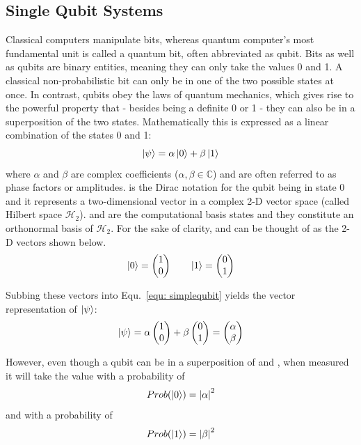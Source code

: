 \subsection{Single Qubit Systems}
\label{subsubsec:qubits}
Classical computers manipulate bits, whereas quantum computer's most fundamental unit is called a quantum bit, often abbreviated as qubit. Bits as well as qubits are binary entities, meaning they can only take the values 0 and 1. A classical non-probabilistic bit can only be in one of the two possible states at once. In contrast, qubits obey the laws of quantum mechanics, which gives rise to the powerful property that - besides being a definite 0 or 1 - they can also be in a superposition of the two states. Mathematically this is expressed as a linear combination of the states 0 and 1:
\begin{equation}
\label{equ: simplequbit}
\ket{\psi} = \alpha \ket{0} + \beta \ket{1}
\end{equation}
where $\alpha$ and $\beta$ are complex coefficients ($\alpha, \beta \in \mathbb{C}$) and are often referred to as phase factors or amplitudes. \0 is the Dirac notation for the qubit being in state 0 and it represents a two-dimensional vector in a complex 2-D vector space (called Hilbert space $\mathcal{H}_{2}$). \0 and \1 are the computational basis states and they constitute an orthonormal basis of $\mathcal{H}_{2}$. For the sake of clarity, \0 and \1 can be thought of as the 2-D vectors shown below.
\begin{equation}
\label{equ: 0and1kets}
\ket{0} =  \begin{pmatrix}1\\0\end{pmatrix} \quad \quad \ket{1} = \begin{pmatrix}0\\1\end{pmatrix}
\end{equation}

Subbing these vectors into Equ.~\ref{equ: simplequbit} yields the vector representation of $\ket{\psi}$:
\begin{equation}
\label{equ: simplequbitvector}
\ket{\psi} = \alpha \begin{pmatrix}1\\0\end{pmatrix} + \beta \begin{pmatrix}0\\1\end{pmatrix} = \begin{pmatrix}\alpha\\\beta\end{pmatrix}
\end{equation}

However, even though a qubit can be in a superposition of \0 and \1, when measured it will take the value \0 with a probability of
\begin{equation}
\label{equ:bornrule0}
Prob(\ket{0}) = {|\alpha|}^{2}
\end{equation}
and \1 with a probability of 
\begin{equation}
\label{equ:bornrule1}
Prob(\ket{1}) = {|\beta|}^{2}
\end{equation}


